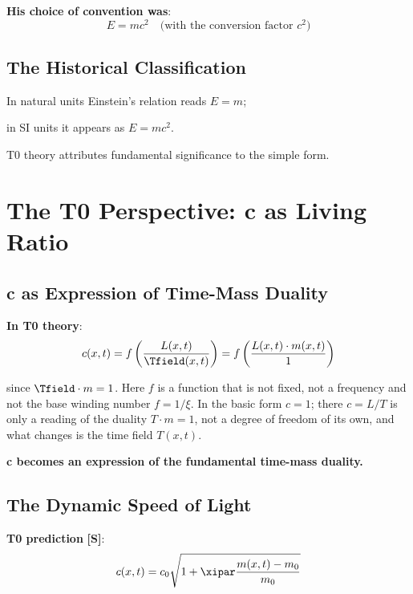 	\textbf{His choice of convention was}:
	\begin{equation}
		E = mc^2 \quad \text{(with the conversion factor $c^2$)}
	\end{equation}
	
	\subsection{The Historical Classification}
	
	\begin{tcolorbox}[colback=blue!5!white,colframe=blue!75!black,title=An Observation]
		In natural units Einstein's relation reads $E = m$; 
		
		in SI units it appears as $E = mc^2$.
		
		T0 theory attributes fundamental significance to the simple form.
	\end{tcolorbox}
	
	\section{The T0 Perspective: c as Living Ratio}
	
	\subsection{c as Expression of Time-Mass Duality}
	
	\textbf{In T0 theory}:
	\begin{equation}
		c(x,t) = f\left(\frac{L(x,t)}{\Tfield(x,t)}\right) = f\left(\frac{L(x,t) \cdot m(x,t)}{1}\right)
	\end{equation}

	since $\Tfield \cdot m = 1$. Here $f$ is a function that is not fixed, not a frequency and not the base winding number $f = 1/\xi$. In the basic form $c = 1$; there $c = L/T$ is only a reading of the duality $T\cdot m = 1$, not a degree of freedom of its own, and what changes is the time field $T(x,t)$.
	
	\textbf{c becomes an expression of the fundamental time-mass duality.}
	
	\subsection{The Dynamic Speed of Light}
	
	\textbf{T0 prediction} \textbf{[S]}: 
	\begin{equation}
		c(x,t) = c_0 \sqrt{1 + \xipar \frac{m(x,t) - m_0}{m_0}}
	\end{equation}
	
